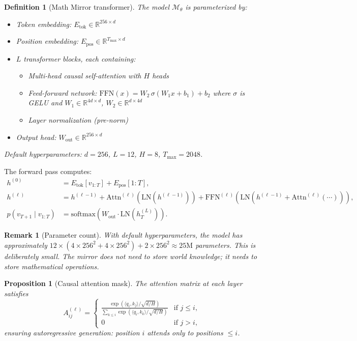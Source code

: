 \documentclass[11pt,a4paper]{article}
\newtheorem{proposition}[theorem]{Proposition}
\newtheorem{definition}[theorem]{Definition}
\newtheorem{remark}[theorem]{Remark}
\newcommand{\R}{\mathbb{R}}
\newcommand{\cM}{\mathcal{M}}
\newcommand{\ip}[2]{\langle #1, #2 \rangle}
\newcommand{\softmax}{\mathrm{softmax}}
\begin{document}
\begin{definition}[Math Mirror transformer]\label{def:model}
The model $\cM_\theta$ is parameterized by:
\begin{itemize}[nosep]
\item Token embedding: $E_{\mathrm{tok}} \in \R^{256 \times d}$
\item Position embedding: $E_{\mathrm{pos}} \in \R^{T_{\max} \times d}$
\item $L$ transformer blocks, each containing:
  \begin{itemize}[nosep]
  \item Multi-head causal self-attention with $H$ heads
  \item Feed-forward network: $\mathrm{FFN}(x) = W_2 \,\sigma(W_1 x + b_1) + b_2$
    where $\sigma$ is GELU and $W_1 \in \R^{4d \times d}$, $W_2 \in \R^{d \times 4d}$
  \item Layer normalization (pre-norm)
  \end{itemize}
\item Output head: $W_{\mathrm{out}} \in \R^{256 \times d}$
\end{itemize}
Default hyperparameters: $d = 256$, $L = 12$, $H = 8$,
$T_{\max} = 2048$.
\end{definition}

The forward pass computes:
\begin{align}
h^{(0)} &= E_{\mathrm{tok}}[v_{1:T}] + E_{\mathrm{pos}}[1{:}T], \label{eq:embed}\\
h^{(\ell)} &= h^{(\ell-1)} + \mathrm{Attn}^{(\ell)}(\mathrm{LN}(h^{(\ell-1)}))
  + \mathrm{FFN}^{(\ell)}(\mathrm{LN}(h^{(\ell-1)} + \mathrm{Attn}^{(\ell)}(\cdots))),
  \label{eq:block}\\
p(v_{T+1} \mid v_{1:T}) &= \softmax(W_{\mathrm{out}} \cdot \mathrm{LN}(h^{(L)}_{T})).
  \label{eq:output}
\end{align}

\begin{remark}[Parameter count]\label{rem:params}
With default hyperparameters, the model has approximately
$12 \times (4 \times 256^2 + 4 \times 256^2) + 2 \times 256^2
\approx 25\text{M}$ parameters.
This is deliberately small.
The mirror does not need to store world knowledge;
it needs to store mathematical operations.
\end{remark}

\begin{proposition}[Causal attention mask]\label{prop:causal}
The attention matrix at each layer satisfies
\begin{equation}\label{eq:causal}
A_{ij}^{(\ell)} = \begin{cases}
\frac{\exp(\ip{q_i}{k_j}/\sqrt{d/H})}
     {\sum_{k \leq i} \exp(\ip{q_i}{k_k}/\sqrt{d/H})}
     & \text{if } j \leq i, \\
0 & \text{if } j > i,
\end{cases}
\end{equation}
ensuring autoregressive generation: position $i$ attends only
to positions $\leq i$.
\end{proposition}
\end{document}
